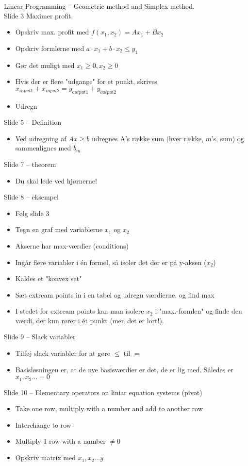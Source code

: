 \documentclass[danish, 10pt]{Memoir}
\begin{document}
Linear Programming -- Geometric method and Simplex method.
\\
Slide 3
Maximer profit.
\begin{itemize}
\item Opskriv max. profit med $f(x_1, x_2) = Ax_1 + Bx_2$
\item Opskriv formlerne med $a \cdot x_1 + b \cdot x_2 \leq y_1$
\item Gør det muligt med $x_1 \geq 0, x_2 \geq 0$
\item Hvis der er flere "udgange" for et punkt, skrives $x_{input1}+x_{input2} = y_{output1}+y_{output2}$
\item Udregn
\end{itemize}
Slide 5 -- Definition
\begin{itemize}
\item Ved udregning af $Ax \geq b$ udregnes A's række sum (hver række, $m$'s, sum) og sammenlignes med $b_m$
\end{itemize}
Slide 7 -- theorem
\begin{itemize}
\item Du skal lede ved hjørnerne!
\end{itemize}
Slide 8 -- eksempel
\begin{itemize}
\item Følg slide 3
\item Tegn en graf med variablerne $x_1$ og $x_2$
\item Akserne har max-værdier (conditions)
\item Ingår flere variabler i én formel, så isoler det der er på y-aksen ($x_2$)
\item Kaldes et "konvex set"
\item Sæt extream points in i en tabel og udregn værdierne, og find max
\item I stedet for extream points kan man isolere $x_2$ i "max.-formlen" og finde den værdi, der kun rører i ét punkt (men det er lort!).
\end{itemize}
Slide 9 -- Slack variabler
\begin{itemize}
\item Tilføj slack variabler for at gøre $\leq$ til $=$
\item Basisløsningen er, at de nye basisværdier er det, de er lig med. Således er $x_1, x_2 \ldots = 0$
\end{itemize}
Slide 10 -- Elementary operators on liniar equation systems (pivot)
\begin{itemize}
\item Take one row, multiply with a number and add to another row
\item Interchange to row
\item Multiply 1 row with a number $\not = 0$
\item Opskriv matrix med $x_1, x_2 \ldots y$
\end{itemize}
\end{document}
